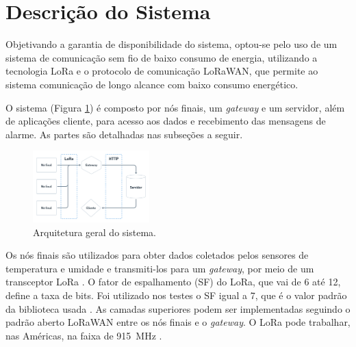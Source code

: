 \section{Descrição do Sistema}
    
    Objetivando a garantia de disponibilidade do sistema, optou-se pelo uso de um sistema de comunicação sem fio de baixo consumo de energia, utilizando a tecnologia LoRa e o protocolo de comunicação LoRaWAN, que permite ao sistema comunicação de longo alcance com baixo consumo energético.
    
    O sistema (Figura \ref{fig:arch}) é composto por nós finais, um \textit{gateway} e um servidor, além de aplicações cliente, para acesso aos dados e recebimento das mensagens de alarme. As partes são detalhadas nas subseções a seguir.
\begin{figure}[t!]
    \begin{center}
        \centering
        \includegraphics[width=0.4\textwidth]{assets/schematic.png}
    \end{center}
    \caption{\label{esquema} Arquitetura geral do sistema.}
    \label{fig:arch}
\end{figure}

    Os nós finais são utilizados para obter dados coletados pelos sensores de temperatura e umidade e transmiti-los para um \textit{gateway}, por meio de  um transceptor LoRa \cite{ref2}. O fator de espalhamento (SF) do LoRa, que vai de 6 até 12\cite{ref3}, define a taxa de bits. Foi utilizado nos testes o SF igual a 7, que é o valor padrão da biblioteca usada \cite{ref4}. As camadas superiores podem ser implementadas seguindo o padrão aberto LoRaWAN entre os nós finais e o \textit{gateway}. O LoRa pode trabalhar, nas Américas, na faixa de 915~MHz \cite{ref2}. %
    
